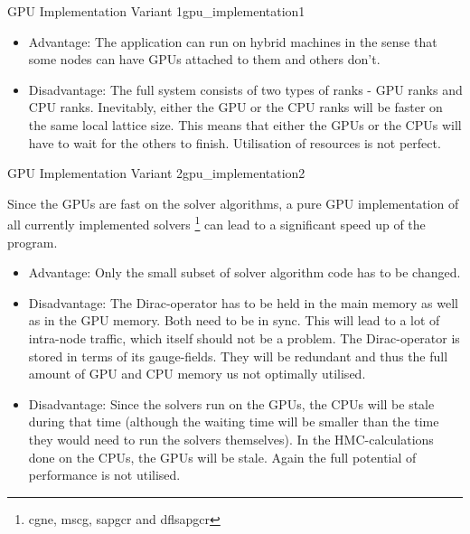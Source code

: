 \documentclass{article}
\theoremstyle{plain} %
\theoremstyle{convention} %
\theoremstyle{remark} %
\numberwithin{equation}{section}
\begin{document}
\begin{proposal}{GPU Implementation Variant 1}{gpu_implementation1}
\begin{itemize}
    \item Advantage: The application can run on hybrid machines in the sense that some nodes can have GPUs attached to them and others don't.
    \item Disadvantage: The full system consists of two types of ranks - GPU ranks and CPU ranks. Inevitably, either the GPU or the CPU ranks will be faster on the same local lattice size. This means that either the GPUs or the CPUs will have to wait for the others to finish. Utilisation of resources is not perfect.
\end{itemize}

\end{proposal}

\begin{proposal}{GPU Implementation Variant 2}{gpu_implementation2} %

Since the GPUs are fast on the solver algorithms, a pure GPU implementation of all currently implemented solvers \footnote{\acrshort{cgne}, \acrshort{mscg}, \acrshort{sapgcr} and \acrshort{dflsapgcr}} can lead to a significant speed up of the program.

\begin{itemize}
    \item Advantage: Only the small subset of solver algorithm code has to be changed.
    \item Disadvantage: The Dirac-operator has to be held in the main memory as well as in the GPU memory. Both need to be in sync. This will lead to a lot of intra-node traffic, which itself should not be a problem. The Dirac-operator is stored in terms of its gauge-fields. They will be redundant and thus the full amount of GPU and CPU memory us not optimally utilised.
    \item Disadvantage: Since the solvers run on the GPUs, the CPUs will be stale during that time (although the waiting time will be smaller than the time they would need to run the solvers themselves). In the HMC-calculations done on the CPUs, the GPUs will be stale. Again the full potential of performance is not utilised.
\end{itemize}

\end{proposal}
\end{document}
